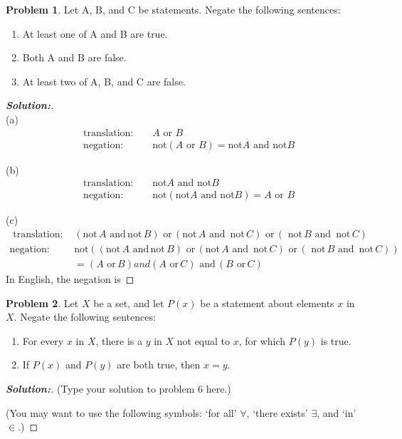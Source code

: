 \documentclass[12pt]{article}
\theoremstyle{definition}\newtheorem{problem}{Problem}
\newenvironment{solution}{\begin{proof}[\bfseries\textup{Solution:}]}{\end{proof}}
\begin{document}
\newpage
\begin{problem}
Let A, B, and C be statements.  Negate the following sentences:
\begin{enumerate}
\item At least one of A and B are true.
\item Both A and B are false.
\item At least two of A, B, and C are false.
\end{enumerate}
\end{problem}
\begin{solution}  \, \\
    
    
    (a) \begin{align}
        &\text{translation: } &&A \text{ or } B \\
        &\text{negation: } &&\text{not} (A \text{ or } B) = \text{not} A \text{ and } \text{not} B
    \end{align}

    (b) \begin{align}
        &\text{translation: } &&\text{not} A \text{ and } \text{not} B \\
        &\text{negation: } &&\text{not} (\text{not} A \text{ and } \text{not} B) = A \text{ or } B
    \end{align}

    (c) \begin{align}
        \text{  translation: } &(\text{not}\,A \text{ and}\,\text{not}\,B) \text{ or}\, (\text{not}\,A \text{ and}\, \text{ not}\,C) \text{ or}\,(\text{ not}\,B \text{ and}\,\text{ not}\,C)\\
        \text{negation: } &\text{not}((\text{not}\,A \text{ and}\,\text{not}\,B) \text{ or}\, (\text{not}\,A \text{ and}\, \text{ not}\,C) \text{ or}\,(\text{ not}\,B \text{ and}\,\text{ not}\,C))\\
        & = ( A \text{ or}\, B) and (A  \text{ or}\, C) \text{ and}\, (B \text{ or}\, C)
    \end{align}
In English, the negation is 
\end{solution}

\newpage
\begin{problem}
Let $X$ be a set, and let $P(x)$ be a statement about elements $x$ in $X$.  Negate the following sentences:
\begin{enumerate}
\item For every $x$ in $X$, there is a $y$ in $X$ not equal to $x$, for which $P(y)$ is true.
\item If $P(x)$ and $P(y)$ are both true, then $x = y$.
\end{enumerate}
\end{problem}
\begin{solution}
(Type your solution to problem 6 here.)

(You may want to use the following symbols: `for all' $\forall$, `there exists' $\exists$, and `in' $\in$.)
\end{solution}
\end{document}
